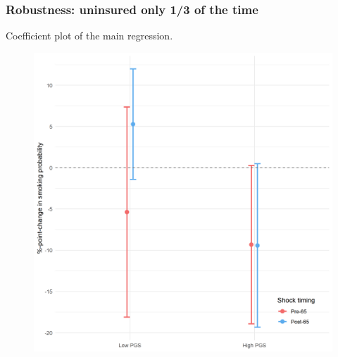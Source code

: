 \documentclass[10pt,compress,xcolor=dvipsnames,aspectratio=169]{beamer}    %
\newcounter{ex}
\newcommand{\1}[1]{\mathrm{1\hspace*{-2.5pt}l}[#1]}	%
\begin{document}
\begin{frame}
\frametitle{Robustness: uninsured only 1/3 of the time}
Coefficient plot of the main regression.
\begin{figure}[hbtp]
\centering
\includegraphics[height=0.8\textheight]{../../3_output/shock_effects/robustness_607033_cvplot.png}
\label{fig:coeffplot33unins}
\end{figure}
\hyperlink{frame:robustness}{}
\end{frame}
\end{document}

